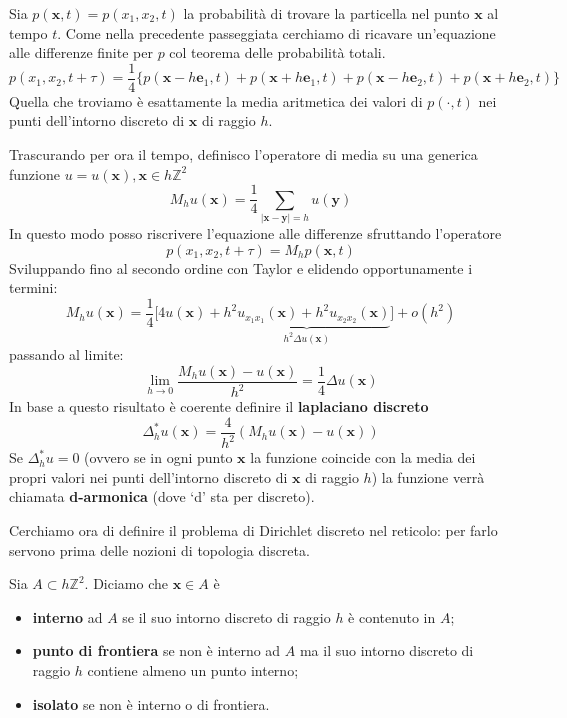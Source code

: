 \documentclass[10pt,a4paper,twoside,openright]{book}
\newcommand{\x}{\mathbf{x}}
\newcommand{\y}{\mathbf{y}}
\begin{document}
Sia $\displaystyle p(\x,t) =p(x_{1},x_{2},t)$ la probabilità di trovare la particella nel punto $\x$ al tempo $t$. Come nella precedente passeggiata cerchiamo di ricavare un'equazione alle differenze finite per $p$ col teorema delle probabilità totali.
\begin{equation*}
	p(x_{1},x_{2},t+\tau) =\frac{1}{4}\{p(\x-h\mathbf{e}_{1},t) +p(\x+h\mathbf{e}_{1},t) +p(\x-h\mathbf{e}_{2},t) +p(\x+h\mathbf{e}_{2},t)\}
\end{equation*}
Quella che troviamo è esattamente la media aritmetica dei valori di $p(\cdotp,t)$ nei punti dell'intorno discreto di $\x$ di raggio $h$. 

Trascurando per ora il tempo, definisco l'operatore di media su una generica funzione $u=u(\x),\x\in h\mathbb{Z}^{2}$
\begin{equation*}
	M_{h} u(\x) =\frac{1}{4}\sum _{| \x-\y| =h} u(\y)
\end{equation*}
In questo modo posso riscrivere l'equazione alle differenze sfruttando l'operatore
\begin{equation*}
	p(x_{1},x_{2},t+\tau) =M_{h} p(\x,t)
\end{equation*}
Sviluppando fino al secondo ordine con Taylor e elidendo opportunamente i termini:
\begin{equation*}
M_{h} u(\x) =\frac{1}{4}\bigg[4u(\x) +\underbrace{h^{2} u_{x_{1} x_{1}}(\x) +h^{2} u_{x_{2} x_{2}}(\x)}_{h^{2} \Delta u(\x)}\bigg] +o\left(h^{2}\right)
\end{equation*}
passando al limite:
\begin{equation*}
\lim _{h\rightarrow 0}\frac{M_{h} u(\x) -u(\x)}{h^{2}} =\frac{1}{4} \Delta u(\x)
\end{equation*}
In base a questo risultato è coerente definire il \textbf{laplaciano discreto}
\begin{equation}
	\Delta ^{*}_{h} u(\x) =\frac{4}{h^{2}}(M_{h} u(\x) -u(\x))
\end{equation}
Se $\displaystyle \Delta ^{*}_{h} u=0$ (ovvero se in ogni punto $\x$ la funzione coincide con la media dei propri valori nei punti dell'intorno discreto di $\x$ di raggio $h$) la funzione verrà chiamata \textbf{d-armonica} (dove `d' sta per discreto).

Cerchiamo ora di definire il problema di Dirichlet discreto nel reticolo: per farlo servono prima delle nozioni di topologia discreta.

Sia $\displaystyle A \subset h\mathbb{Z}^{2}$. Diciamo che $\x\in A$ è
\begin{itemize}
	\item \textbf{interno} ad $A$ se il suo intorno discreto di raggio $h$ è contenuto in $A$;
	\item \textbf{punto di frontiera} se non è interno ad $A$ ma il suo intorno discreto di raggio $h$ contiene almeno un punto interno;
	\item \textbf{isolato} se non è interno o di frontiera.
\end{itemize}
\end{document}
